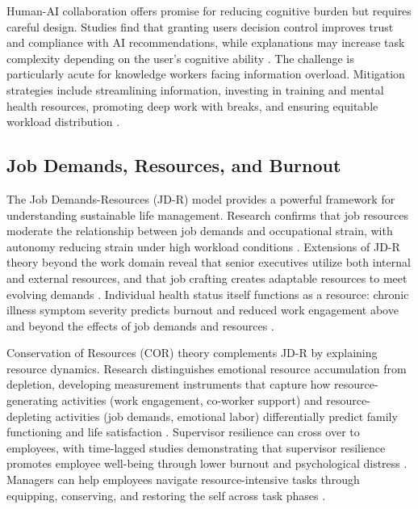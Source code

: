 Human-AI collaboration offers promise for reducing cognitive burden but requires careful design. Studies find that granting users decision control improves trust and compliance with AI recommendations, while explanations may increase task complexity depending on the user's cognitive ability \citep{westphal_decision_2023}. The challenge is particularly acute for knowledge workers facing information overload. Mitigation strategies include streamlining information, investing in training and mental health resources, promoting deep work with breaks, and ensuring equitable workload distribution \citep{Robinson2024}.

\subsection{Job Demands, Resources, and Burnout}

The Job Demands-Resources (JD-R) model provides a powerful framework for understanding sustainable life management. Research confirms that job resources moderate the relationship between job demands and occupational strain, with autonomy reducing strain under high workload conditions \citep{ghanayem_occupational_2020}. Extensions of JD-R theory beyond the work domain reveal that senior executives utilize both internal and external resources, and that job crafting creates adaptable resources to meet evolving demands \citep{duan_extending_2024}. Individual health status itself functions as a resource: chronic illness symptom severity predicts burnout and reduced work engagement above and beyond the effects of job demands and resources \citep{cook_individual_2024}.

Conservation of Resources (COR) theory complements JD-R by explaining resource dynamics. Research distinguishes emotional resource accumulation from depletion, developing measurement instruments that capture how resource-generating activities (work engagement, co-worker support) and resource-depleting activities (job demands, emotional labor) differentially predict family functioning and life satisfaction \citep{ilies_emotional_2020}. Supervisor resilience can cross over to employees, with time-lagged studies demonstrating that supervisor resilience promotes employee well-being through lower burnout and psychological distress \citep{brady_supervisor_2025}. Managers can help employees navigate resource-intensive tasks through equipping, conserving, and restoring the self across task phases \citep{molinsky_how_2023}.


